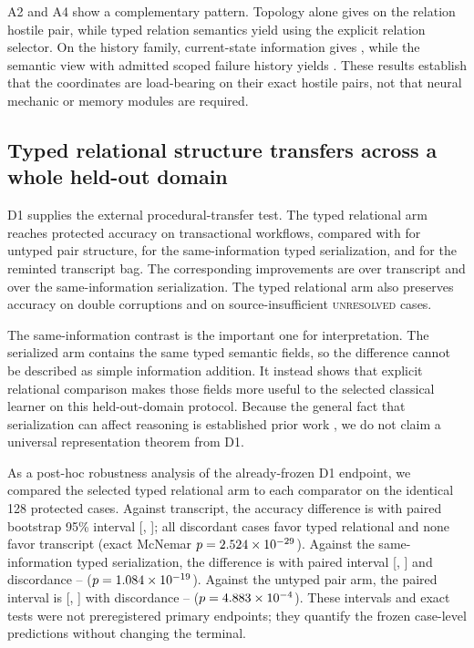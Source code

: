 \documentclass[10pt]{article}
\begin{document}
A2 and A4 show a complementary pattern. Topology alone gives \ATwoTopologyAccuracy{} on the relation hostile pair, while typed relation semantics yield \ATwoTypedAccuracy{} using the explicit relation selector. On the history family, current-state information gives \AFourCurrentAccuracy{}, while the semantic view with admitted scoped failure history yields \AFourSemanticAccuracy{}. These results establish that the coordinates are load-bearing on their exact hostile pairs, not that neural mechanic or memory modules are required.

\subsection{Typed relational structure transfers across a whole held-out domain}

D1 supplies the external procedural-transfer test. The typed relational arm reaches \DOneTypedAccuracy{} protected accuracy on transactional workflows, compared with \DOneUntypedAccuracy{} for untyped pair structure, \DOneSerializedAccuracy{} for the same-information typed serialization, and \DOneTranscriptAccuracy{} for the reminted transcript bag. The corresponding improvements are \DOneTypedMinusTranscript{} over transcript and \DOneTypedMinusSerialized{} over the same-information serialization. The typed relational arm also preserves \DOneTypedDoubleAccuracy{} accuracy on double corruptions and \DOneTypedUnresolvedAccuracy{} on source-insufficient \textsc{unresolved} cases.

The same-information contrast is the important one for interpretation. The serialized arm contains the same typed semantic fields, so the \DOneTypedMinusSerialized{} difference cannot be described as simple information addition. It instead shows that explicit relational comparison makes those fields more useful to the selected classical learner on this held-out-domain protocol. Because the general fact that serialization can affect reasoning is established prior work \citep{lo2026serialization}, we do not claim a universal representation theorem from D1.

As a post-hoc robustness analysis of the already-frozen D1 endpoint, we compared the selected typed relational arm to each comparator on the identical 128 protected cases. Against transcript, the accuracy difference is \DOneTypedMinusTranscript{} with paired bootstrap 95\% interval [\DOneTranscriptPairedCILow, \DOneTranscriptPairedCIHigh]; all \DOneTranscriptDiscordantWins{} discordant cases favor typed relational and none favor transcript (exact McNemar $p=2.524\times 10^{-29}$). Against the same-information typed serialization, the difference is \DOneTypedMinusSerialized{} with paired interval [\DOneSerializedPairedCILow, \DOneSerializedPairedCIHigh] and discordance \DOneSerializedDiscordantWins{}--\DOneSerializedDiscordantLosses{} ($p=1.084\times 10^{-19}$). Against the untyped pair arm, the paired interval is [\DOneUntypedPairedCILow, \DOneUntypedPairedCIHigh] with discordance \DOneUntypedDiscordantWins{}--\DOneUntypedDiscordantLosses{} ($p=4.883\times 10^{-4}$). These intervals and exact tests were not preregistered primary endpoints; they quantify the frozen case-level predictions without changing the terminal.
\end{document}
